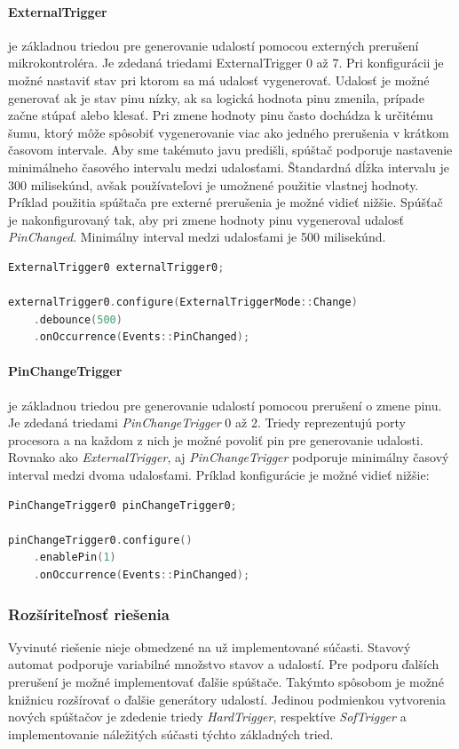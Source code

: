 \paragraph*{ExternalTrigger} \: je základnou triedou pre generovanie udalostí pomocou externých prerušení mikrokontroléra. Je zdedaná triedami ExternalTrigger 0 až 7.
Pri konfigurácii je možné nastaviť stav pri ktorom sa má udalosť vygenerovať. Udalosť je možné generovať ak je stav pinu nízky, ak sa logická hodnota pinu zmenila, prípade
začne stúpať alebo klesať. Pri zmene hodnoty pinu často dochádza k určitému šumu, ktorý môže spôsobiť vygenerovanie viac ako jedného prerušenia v krátkom časovom intervale.
Aby sme takémuto javu predišli, spúštač podporuje nastavenie minimálneho časového intervalu medzi udalosťami.
Štandardná dĺžka intervalu je 300 milisekúnd, avšak používateľovi je umožnené použitie vlastnej hodnoty.
Príklad použitia spúštača pre externé prerušenia je možné vidieť nižšie. Spúšťač je nakonfigurovaný tak, aby pri zmene hodnoty pinu vygeneroval udalosť \textit{PinChanged}.
Minimálny interval medzi udalosťami je 500 milisekúnd.
\begin{lstlisting}[language=c++]      
ExternalTrigger0 externalTrigger0;

externalTrigger0.configure(ExternalTriggerMode::Change)
    .debounce(500)
    .onOccurrence(Events::PinChanged);
\end{lstlisting}

\paragraph*{PinChangeTrigger} \: je základnou triedou pre generovanie udalostí pomocou prerušení o zmene pinu. Je zdedaná triedami \textit{PinChangeTrigger} 0 až 2.
Triedy reprezentujú porty procesora a na každom z nich je možné povoliť pin pre generovanie udalosti. Rovnako ako \textit{ExternalTrigger}, aj \textit{PinChangeTrigger}
podporuje minimálny časový interval medzi dvoma udalosťami. Príklad konfigurácie je možné vidieť nižšie:
\begin{lstlisting}[language=c++]      
PinChangeTrigger0 pinChangeTrigger0;

pinChangeTrigger0.configure()
    .enablePin(1)
    .onOccurrence(Events::PinChanged);
\end{lstlisting}

\subsubsection{Rozšíriteľnosť riešenia}

Vyvinuté riešenie nieje obmedzené na už implementované súčasti. Stavový automat podporuje variabilné množstvo stavov a udalostí. Pre podporu ďalších prerušení
je možné implementovať ďalšie spúštače. Takýmto spôsobom je možné knižnicu rozšírovať o ďalšie generátory udalostí. Jedinou podmienkou vytvorenia nových spúštačov je
zdedenie triedy \textit{HardTrigger}, respektíve \textit{SofTrigger} a implementovanie náležitých súčasti týchto základných tried.
